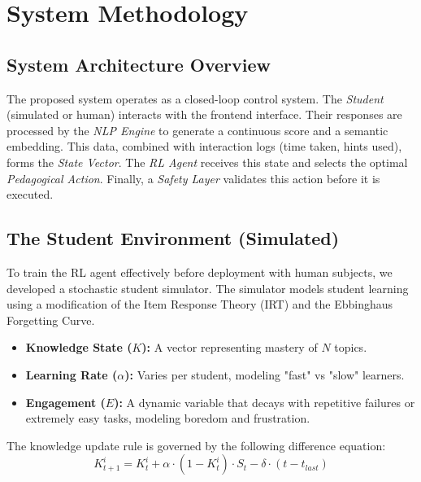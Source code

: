 \documentclass[conference]{IEEEtran}
\begin{document}
\section{System Methodology}

\subsection{System Architecture Overview}
The proposed system operates as a closed-loop control system. The \textit{Student} (simulated or human) interacts with the frontend interface. Their responses are processed by the \textit{NLP Engine} to generate a continuous score and a semantic embedding. This data, combined with interaction logs (time taken, hints used), forms the \textit{State Vector}. The \textit{RL Agent} receives this state and selects the optimal \textit{Pedagogical Action}. Finally, a \textit{Safety Layer} validates this action before it is executed.

\subsection{The Student Environment (Simulated)}
To train the RL agent effectively before deployment with human subjects, we developed a stochastic student simulator. The simulator models student learning using a modification of the Item Response Theory (IRT) and the Ebbinghaus Forgetting Curve.
\begin{itemize}
    \item \textbf{Knowledge State ($K$):} A vector representing mastery of $N$ topics.
    \item \textbf{Learning Rate ($\alpha$):} Varies per student, modeling "fast" vs "slow" learners.
    \item \textbf{Engagement ($E$):} A dynamic variable that decays with repetitive failures or extremely easy tasks, modeling boredom and frustration.
\end{itemize}

The knowledge update rule is governed by the following difference equation:
\begin{equation}
K_{t+1}^i = K_t^i + \alpha \cdot (1 - K_t^i) \cdot S_t - \delta \cdot (t - t_{last})
\end{equation}
\end{document}
